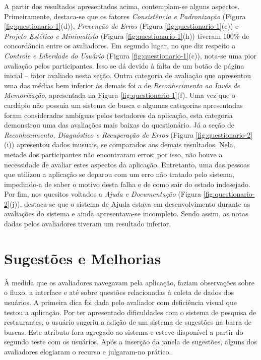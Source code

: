 A partir dos resultados apresentados acima, contemplam-se alguns aspectos. Primeiramente, destaca-se que os fatores \textit{Consistência e Padronização} (Figura \ref{fig:questionario-1}(d)), \textit{Prevenção de Erros} (Figura \ref{fig:questionario-1}(e)) e \textit{Projeto Estético e Minimalista} (Figura \ref{fig:questionario-1}(h)) tiveram 100\% de concordância entre os avaliadores. Em segundo lugar, no que diz respeito a \textit{Controle e Liberdade do Usuário} (Figura \ref{fig:questionario-1}(c)), nota-se uma pior avaliação pelos participantes. Isso se dá devido à falta de um botão de página inicial -- fator avaliado nesta seção. Outra categoria de avaliação que apresentou uma das médias bem inferior às demais foi a de \textit{Reconhecimento ao Invés de Memorização}, apresentada na Figura \ref{fig:questionario-1}(f). Uma vez que o cardápio não possuía um sistema de busca e algumas categorias apresentadas foram consideradas ambíguas pelos testadores da aplicação, esta categoria demonstrou uma das avaliações mais baixas do questionário. Já a seção de \textit{Reconhecimento, Diagnóstico e Recuperação de Erros} (Figura \ref{fig:questionario-2}(i)) apresentou dados inusuais, se comparados aos demais resultados. Nela, metade dos participantes não encontraram erros; por isso, não houve a necessidade de avaliar estes aspectos da aplicação. Entretanto, uma das pessoas que utilizou a aplicação se deparou com um erro não tratado pelo sistema, impedindo-a de saber o motivo desta falha e de como sair do estado indesejado. Por fim, nos quesitos voltados a \textit{Ajuda e Documentação} (Figura \ref{fig:questionario-2}(j)), destaca-se que o sistema de Ajuda estava em desenvolvimento durante as avaliações do sistema e ainda apresentava-se incompleto. Sendo assim, as notas dadas pelos avaliadores tiveram um resultado inferior.

\section{\label{sec:sugestoes}Sugestões e Melhorias}

À medida que os avaliadores navegavam pela aplicação, faziam observações sobre o fluxo, a interface e até sobre questões relacionadas à coleta de dados dos usuários. A primeira dica foi dada pelo avaliador com deficiência visual que testou a aplicação. Por ter apresentado dificuldades com o sistema de pesquisa de restaurantes, o usuário sugeriu a adição de um sistema de sugestões na barra de buscas. Este atributo fora agregado ao sistema e esteve disponível a partir do segundo teste com os usuários. Após a inserção da janela de sugestões, alguns dos avaliadores elogiaram o recurso e julgaram-no prático.

